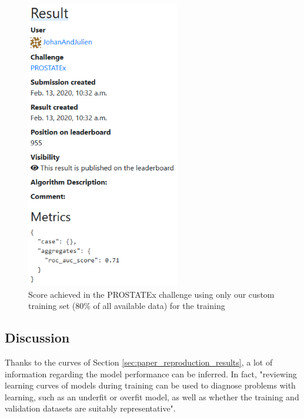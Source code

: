 \begin{figure}[!t]
\centering
\includegraphics[width=0.6\textwidth, keepaspectratio=true]{./figures/paper_reproduction_results_challenge1.png}
\caption{Score achieved in the PROSTATEx challenge using only our custom training set (80\% of all available data) for the training}
\label{fig:paper_reproduction_results_challenge_1}
\end{figure}


\subsection{Discussion}
\setlength{\marginparwidth}{3cm}\leavevmode {}Thanks to the curves of Section \ref{sec:paper_reproduction_results}, a lot of information regarding the model performance can be inferred. In fact, "reviewing learning curves of models during training can be used to diagnose problems with learning, such as an underfit or overfit model, as well as whether the training and validation datasets are suitably representative"\cite{40}.

